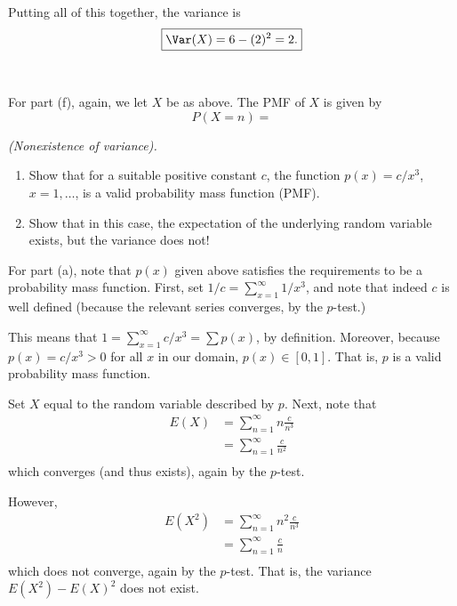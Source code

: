 \begin{solution}
  Putting all of this together, the variance is
  \[
    \boxed{\Var(X)=6-(2)^2=2.}
  \]
  \\\\
  For part (f), again, we let \(X\) be as above. The PMF of \(X\) is given
  by
  \[
    P(X=n)=
  \]
\end{solution}
\newpage

\begin{problem}[Handout 7, \# 8]
  \emph{(Nonexistence of variance).}
  \begin{enumerate}[label=(\alph*),noitemsep]
  \item Show that for a suitable positive constant \(c\), the function
    \(p(x)=c/x^3\), \(x=1,\dots\), is a valid probability mass function
    (PMF).
  \item Show that in this case, the expectation of the underlying random
    variable exists, but the variance does not!
  \end{enumerate}

\end{problem}
\begin{solution}
  For part (a), note that $p(x)$ given above satisfies the requirements to
  be a probability mass function. First, set
  $1/c = \sum_{x=1}^\infty 1/x^3$, and note that indeed $c$ is well defined
  (because the relevant series converges, by the \(p\)-test.)

  This means that $1=\sum_{x=1}^\infty c/x^3 = \sum p(x)$, by
  definition. Moreover, because $p(x) = c/x^3 > 0$ for all $x$ in our
  domain, $p(x) \in [0,1]$. That is, $p$ is a valid probability mass
  function.

  Set $X$ equal to the random variable described by $p$. Next, note that
  \begin{align*}
    E(X) &= \sum_{n=1}^\infty n \frac{c}{n^3}\\
         &= \sum_{n=1}^\infty \frac{c}{n^2}\\
  \end{align*}
  which converges (and thus exists), again by the \(p\)-test.

  However,
  \begin{align*}
    E(X^2) &= \sum_{n=1}^\infty n^2 \frac{c}{n^3}\\
           &= \sum_{n=1}^\infty \frac{c}{n}\\
  \end{align*}
  which does not converge, again by the \(p\)-test. That is, the variance
  $E(X^2)-E(X)^2$ does not exist.
\end{solution}
\newpage

